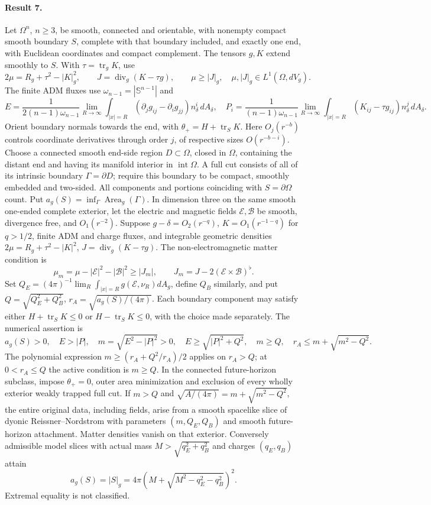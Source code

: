 \documentclass[11pt]{article}
\begin{document}
\paragraph{Result 7.} Let $\Omega^n$, $n\ge3$, be smooth, connected and orientable, with nonempty compact smooth boundary $S$, complete with that boundary included, and exactly one end, with Euclidean coordinates and compact complement. The tensors $g,K$ extend smoothly to $S$. With $\tau=\operatorname{tr}_gK$, use
\[
 2\mu=R_g+\tau^2-|K|_g^2,\qquad J=\operatorname{div}_g(K-\tau g),\qquad
 \mu\ge|J|_g,\quad\mu,|J|_g\in L^1(\Omega,dV_g).
\]
The finite ADM fluxes use $\omega_{n-1}=|\mathbb S^{n-1}|$ and
\[
 E=\frac1{2(n-1)\omega_{n-1}}\lim_{R\to\infty}\int_{|x|=R}
 (\partial_jg_{ij}-\partial_ig_{jj})n_\delta^i\,dA_\delta,\quad
 P_i=\frac1{(n-1)\omega_{n-1}}\lim_{R\to\infty}\int_{|x|=R}(K_{ij}-\tau g_{ij})n_\delta^j\,dA_\delta.
\]
Orient boundary normals towards the end, with $\theta_+=H+\operatorname{tr}_SK$. Here $O_j(r^{-b})$ controls coordinate derivatives through order $j$, of respective sizes $O(r^{-b-i})$. Choose a connected smooth end-side region $D\subset\Omega$, closed in $\Omega$, containing the distant end and having its manifold interior in $\operatorname{int}\Omega$. A full cut consists of all of its intrinsic boundary $\Gamma=\partial D$; require this boundary to be compact, smoothly embedded and two-sided. All components and portions coinciding with $S=\partial\Omega$ count. Put $a_g(S)=\inf_\Gamma\operatorname{Area}_g(\Gamma)$. In dimension three on the same smooth one-ended complete exterior, let the electric and magnetic fields $\mathcal E,\mathcal B$ be smooth, divergence free, and $O_1(r^{-2})$. Suppose $g-\delta=O_2(r^{-q})$, $K=O_1(r^{-1-q})$ for $q>1/2$, finite ADM and charge fluxes, and integrable geometric densities $2\mu=R_g+\tau^2-|K|^2$, $J=\operatorname{div}_g(K-\tau g)$. The non-electromagnetic matter condition is
\[
 \mu_m=\mu-|\mathcal E|^2-|\mathcal B|^2\ge|J_m|,\qquad
 J_m=J-2(\mathcal E\times\mathcal B)^\flat.
\]
Set $Q_E=(4\pi)^{-1}\lim_R\int_{|x|=R}g(\mathcal E,\nu_R)dA_g$, define $Q_B$ similarly, and put $Q=\sqrt{Q_E^2+Q_B^2}$, $r_A=\sqrt{a_g(S)/(4\pi)}$. Each boundary component may satisfy either $H+\operatorname{tr}_SK\le0$ or $H-\operatorname{tr}_SK\le0$, with the choice made separately. The numerical assertion is
\[
 a_g(S)>0,\quad E>|P|,\quad m=\sqrt{E^2-|P|^2}>0,\quad
 E\ge\sqrt{|P|^2+Q^2},\quad m\ge Q,\quad r_A\le m+\sqrt{m^2-Q^2}.
\]
The polynomial expression $m\ge(r_A+Q^2/r_A)/2$ applies on $r_A>Q$; at $0<r_A\le Q$ the active condition is $m\ge Q$. In the connected future-horizon subclass, impose $\theta_+=0$, outer area minimization and exclusion of every wholly exterior weakly trapped full cut. If $m>Q$ and $\sqrt{A/(4\pi)}=m+\sqrt{m^2-Q^2}$, the entire original data, including fields, arise from a smooth spacelike slice of dyonic Reissner--Nordstrom with parameters $(m,Q_E,Q_B)$ and smooth future-horizon attachment. Matter densities vanish on that exterior. Conversely admissible model slices with actual mass $M>\sqrt{q_E^2+q_B^2}$ and charges $(q_E,q_B)$ attain
\[
 a_g(S)=|S|_g=4\pi\left(M+\sqrt{M^2-q_E^2-q_B^2}\right)^2.
\]
Extremal equality is not classified.
\end{document}
